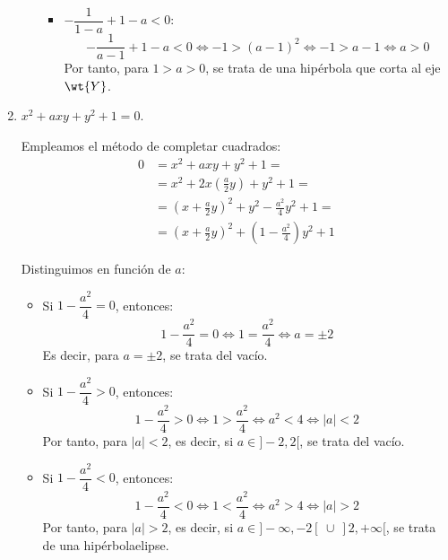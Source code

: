 \begin{ejercicio}
\begin{enumerate}
\begin{itemize}
\begin{itemize}
                \item $-\dfrac{1}{1-a} + 1-a < 0$:
                \begin{equation*}
                    -\frac{1}{a-1} + 1-a < 0 \Longleftrightarrow -1 > (a-1)^2 \Longleftrightarrow -1>a-1 \Longleftrightarrow a>0
                \end{equation*}
                Por tanto, para $1>a>0$, se trata de una hipérbola que corta al eje $\wt{Y}$.
            \end{itemize}
        \end{itemize}


        \item $x^2 + axy + y^2 + 1 = 0$.
        
        Empleamos el método de completar cuadrados:
        \begin{equation*}
            \begin{split}
                0 &= x^2 + axy + y^2 + 1 =\\
                &= x^2 + 2x\left(\frac{a}{2}y\right) + y^2 + 1 =\\
                &= \left(x+\frac{a}{2}y\right)^2 + y^2 - \frac{a^2}{4}y^2 + 1 =\\
                &= \left(x+\frac{a}{2}y\right)^2 + \left(1-\frac{a^2}{4}\right)y^2 + 1
            \end{split}
        \end{equation*}

        Distinguimos en función de $a$:
        \begin{itemize}
            \item Si $1-\dfrac{a^2}{4}=0$, entonces:
            \begin{equation*}
                1-\frac{a^2}{4} = 0 \Longleftrightarrow 1 = \frac{a^2}{4} \Longleftrightarrow a = \pm 2
            \end{equation*}
            Es decir, para $a=\pm 2$, se trata del vacío.

            \item Si $1-\dfrac{a^2}{4} > 0$, entonces:
            \begin{equation*}
                1-\frac{a^2}{4} > 0 \Longleftrightarrow 1 > \frac{a^2}{4} \Longleftrightarrow a^2 < 4 \Longleftrightarrow |a| < 2
            \end{equation*}
            Por tanto, para $|a|<2$, es decir, si $a \in ]-2,2[ $, se trata del vacío.

            \item Si $1-\dfrac{a^2}{4} < 0$, entonces:
            \begin{equation*}
                1-\frac{a^2}{4} < 0 \Longleftrightarrow 1 < \frac{a^2}{4} \Longleftrightarrow a^2 > 4 \Longleftrightarrow |a| > 2
            \end{equation*}
            Por tanto, para $|a|>2$, es decir, si $a \in ]-\infty,-2[~\cup~]2,+\infty[$, se trata de una hipérbolaelipse.
        \end{itemize}

    \end{enumerate}
\end{ejercicio}


